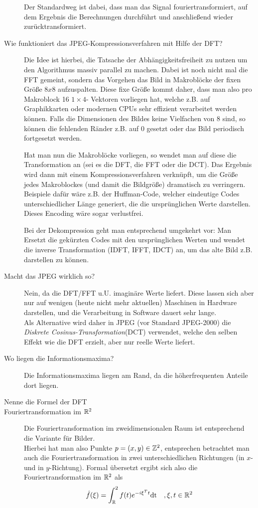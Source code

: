 \begin{description}
      Der Standardweg ist dabei, dass man das Signal fouriertransformiert, auf dem Ergebnis die Berechnungen
      durchführt und anschließend wieder zurücktransformiert.
	\item[Wie funktioniert das JPEG-Kompressionsverfahren mit Hilfe der DFT?]
      Die Idee ist hierbei, die Tatsache der Abhängigkeitsfreiheit zu nutzen um den Algorithmus massiv parallel
      zu machen. Dabei ist noch nicht mal die FFT gemeint, sondern das Vorgehen das Bild in Makroblöcke der
      fixen Größe $8x8$ aufzuspalten. Diese fixe Größe kommt daher, dass man also pro Makroblock 16 $1\times 4$-
      Vektoren vorliegen hat, welche z.B. auf Graphikkarten oder modernen CPUs sehr effizient verarbeitet werden
      können. Falls die Dimensionen des Bildes keine Vielfachen von $8$ sind, so können die fehlenden Ränder
      z.B. auf $0$ gesetzt oder das Bild periodisch fortgesetzt werden.

      Hat man nun die Makroblöcke vorliegen, so wendet man auf diese die Transformation an (sei es die DFT, die
      FFT oder die DCT). Das Ergebnis wird dann mit einem Kompressionsverfahren verknüpft, um die Größe jedes
      Makroblockes (und damit die Bildgröße) dramatisch zu verringern. Beispiele dafür wäre z.B. der Huffman-Code,
      welcher eindeutige Codes unterschiedlicher Länge generiert, die die ursprünglichen Werte darstellen. Dieses
      Encoding wäre sogar verlustfrei.

      Bei der Dekompression geht man entsprechend umgekehrt vor: Man Ersetzt die gekürzten Codes mit den ursprünglichen
      Werten und wendet die inverse Transformation (IDFT, IFFT, IDCT) an, um das alte Bild z.B. darstellen zu können.
    \item[Macht das JPEG wirklich so?]%
      Nein, da die DFT/FFT u.U. imaginäre Werte liefert. Diese lassen sich aber nur auf wenigen (heute nicht mehr
      aktuellen) Maschinen in Hardware darstellen, und die Verarbeitung in Software dauert sehr lange.\\
      Als Alternative wird daher in JPEG (vor Standard JPEG-2000) die \emph{Diskrete Cosinus-Transformation}(DCT)
      verwendet, welche den selben Effekt wie die DFT erzielt, aber nur reelle Werte liefert.
	\item[Wo liegen die Informationsmaxima?]
      Die Informationsmaxima liegen am Rand, da die höherfrequenten Anteile dort liegen.
	\item[Nenne die Formel der DFT]
	\item[Fouriertransformation im $\mathbb{R}^2$]
      Die Fouriertransformation im zweidimensionalen Raum ist entsprechend die Variante für Bilder.\\
      Hierbei hat man also Punkte $p = (x, y) \in \mathbb{Z}^2$, entsprechen betrachtet man auch die Fouriertransformation
      in zwei unterschiedlichen Richtungen (in $x$- und in $y$-Richtung). Formal übersetzt ergibt sich also die
      Fouriertransformation im $\mathbb{R}^2$ als
      $$ \hat f(\xi) = \int_{\mathbb{R}}^2 f(t)e^{-i \xi^T t}\text{dt}\quad, \xi,t\in\mathbb{R}^2 $$
\end{description}
